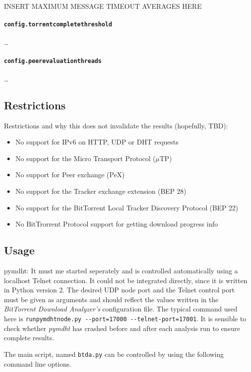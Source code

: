 \documentclass[10pt, a4paper]{scrartcl} %
\renewcommand{\_}{\origunderscore\allowbreak}
\newcommand{\config}[1]{\texttt{config.\allowbreak #1}}
\begin{document}
INSERT MAXIMUM MESSAGE TIMEOUT AVERAGES HERE

\paragraph{\config{torrent\_complete\_threshold}}
\dots

\paragraph{\config{peer\_evaluation\_threads}}
\dots

\subsection{Restrictions}

Restrictions and why this does not invalidate the results (hopefully, TBD):

\begin{itemize}
  \item No support for IPv6 on HTTP, UDP or DHT requests
  \item No support for the Micro Transport Protocol ($\mu$TP)
  \item No support for Peer exchange (PeX)
  \item No support for the Tracker exchange extension (BEP 28)
  \item No support for the BitTorrent Local Tracker Discovery Protocol (BEP 22)
  \item No BitTrorrent Protocol support for getting download progress info
\end{itemize}

\subsection{Usage}
pymdht: It must me started seperately and is controlled automatically using a localhost Telnet connection. It could not be integrated directly, since it is written in Python version 2. The desired UDP node port and the Telnet control port must be given as arguments and should reflect the values written in the \emph{BitTorrent Download Analyzer's} configuration file. The typical command used here is \texttt{run\_pymdht\_node.py -{}-port=17000 -{}-telnet-port=17001}. It is sensible to check whether \emph{pymdht} has crashed before and after each analysis run to ensure complete results. 

The main script, named \texttt{btda.py} can be controlled by using the following command line options.
\end{document}
